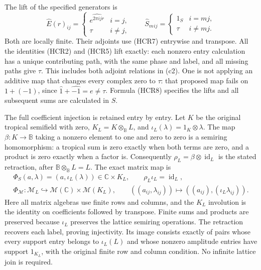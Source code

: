The lift of the specified generators is
\begin{equation}\tag{HCR8}
 \widehat E(r)_{ij}=
   \begin{cases}\widehat{e^{2\pi i j r}}&i=j,\\\tau&i\ne j,
   \end{cases}
 \qquad
 \widehat S_m{}_{ij}=
   \begin{cases}1_S&i=mj,\\\tau&i\ne mj.\end{cases}
\end{equation}
Both are locally finite. Their adjoints use (HCR7) entrywise
and transpose. All the identities (HCR2) and (HCR5) lift exactly:
each nonzero entry calculation has a unique contributing path,
with the same phase and label, and all missing paths give
$\tau$. This includes both adjoint relations in (c2).
One is not applying an additive map that changes every complex
zero to $\tau$: that proposed map fails on $1+(-1)$, since
$\widehat1+\widehat{-1}=e\ne\tau$. Formula (HCR8) specifies
the lifts and all subsequent sums are calculated in $S$.

The full coefficient injection is retained entry by entry.
Let $K$ be the original tropical semifield with zero,
$K_L=K\otimes_{\mathbb B}L$, and
$\iota_L(\lambda)=1_K\otimes\lambda$.
The map $\beta:K\to\mathbb B$ taking a nonzero element
to one and zero to zero is a semiring homomorphism:
a tropical sum is zero exactly when both terms are
zero, and a product is zero exactly when a factor is.
Consequently $\rho_L=\beta\otimes\operatorname{id}_L$
is the stated retraction, after $\mathbb B\otimes_{\mathbb B}L=L$.
The exact matrix map is
\begin{equation}\tag{HCR9}
\begin{gathered}
 \Phi_S(a,\lambda)=(a,\iota_L(\lambda))\in\mathbb C\times K_L,
       \qquad\rho_L\iota_L=\operatorname{id}_L,\\
 \Phi_{\mathscr M}:\mathscr M_L\hookrightarrow
     \mathscr M(\mathbb C)\times\mathscr M(K_L),\qquad
 ((a_{ij},\lambda_{ij}))\longmapsto
                    ((a_{ij}),(\iota_L\lambda_{ij})).
\end{gathered}
\end{equation}
Here all matrix algebras use finite rows and columns, and the
$K_L$ involution is the identity on coefficients followed by
transpose. Finite sums and products are preserved because
$\iota_L$ preserves the lattice semiring operations. The
retraction recovers each label, proving injectivity. Its image
consists exactly of pairs whose every support entry belongs to
$\iota_L(L)$ and whose nonzero amplitude entries have support
$1_{K_L}$, with the original finite row and column condition.
No infinite lattice join is required.

